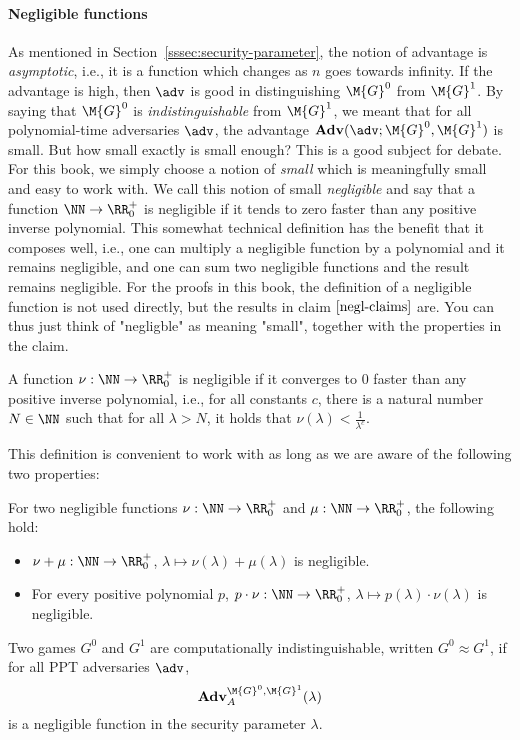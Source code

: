 \paragraph{Negligible functions}
As mentioned in Section~\ref{sssec:security-parameter}, the notion of advantage is \emph{asymptotic}, i.e., it is a function
which changes as $n$ goes towards infinity. If the advantage is high, then $\adv$ is good in distinguishing $\M{G}^0$ from $\M{G}^1$. By saying that $\M{G}^0$ is \emph{indistinguishable} from $\M{G}^1$, we meant that for all polynomial-time adversaries $\adv$, the advantage ${\mathbf{Adv}}(\adv;\M{G}^0,\M{G}^1)$ is small. But how small exactly is small enough? This is a good subject for debate. For this book, we simply choose a notion of \emph{small} which is meaningfully small and easy to work with. We call this notion of small \emph{negligible} and say that a function $\NN\rightarrow \RR_0^+$ is negligible if it tends to zero faster than any positive inverse polynomial. This somewhat technical definition has the benefit that it composes well, i.e., one can multiply a negligible function by a polynomial and it remains negligible, and one can sum two negligible functions and the result remains negligible. For the proofs in this book, the definition of a negligible function is not used directly, but the results in claim $\ref{negl-claims}$ are. You can thus just think of "negligble" as meaning "small", together with the properties in the claim.

\begin{definition}
	A function $\nu:\NN\rightarrow\RR_0^+$ is negligible if it converges to $0$ faster than any positive inverse polynomial, i.e., for all constants $c$, there is a natural number $N\in\NN$ such that for all $\lambda>N$, it holds that $\nu(\lambda)<\frac{1}{\lambda^c}$.
\end{definition}
This definition is convenient to work with as long as we are aware of the following two properties:
\begin{claim}\label{negl-claims}
	For two negligible functions $\nu:\NN\rightarrow\RR_0^+$ and $\mu:\NN\rightarrow\RR_0^+$, the following hold:
	\begin{itemize}
		\item $\nu+\mu:\NN\rightarrow\RR_0^+$, $\lambda\mapsto\nu(\lambda)+\mu(\lambda)$ is negligible.
		\item For every positive polynomial $p$, $p\cdot\nu:\NN\rightarrow\RR_0^+$, $\lambda\mapsto p(\lambda)\cdot\nu(\lambda)$ is negligible.
	\end{itemize}
\end{claim}




\begin{definition}
	Two games $G^0$ and $G^1$ are computationally in\-distinguish\-able, written $G^0 \approx G^1$, if for all PPT adversaries $\adv$,
	\[\mathbf{Adv}^{\M{G}^0,\M{G}^1}_{A}(\lambda)\]
	is a negligible function in the security parameter $\lambda$.
\end{definition}




